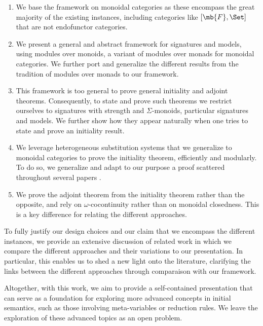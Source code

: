 \begin{enumerate}
  \setlength\itemsep{-1pt}
  \item We base the framework on monoidal categories as these encompass the
        great majority of the existing instances, including categories like
        $[\mb{F},\Set]$ that are not endofunctor categories.

  \item We present a general and abstract framework for signatures and models,
        using modules over monoids, a variant of modules over monads for
        monoidal categories.
        We further port and generalize the different results from the tradition of modules
        over monads to our framework.

  \item This framework is too general to prove general initiality and adjoint theorems.
        Consequently, to state and prove such theorems we restrict ourselves
        to signatures with strength and $Σ$-monoids, particular signatures and models.
        We further show how they appear naturally when one tries to state and prove an initiality result.

  \item We leverage heterogeneous substitution systems that we generalize to monoidal
        categories to prove the initiality theorem, efficiently and modularly.
        To do so, we generalize and adapt to our purpose a proof scattered
        throughout several papers \cite{Hss04,DeBruijnasNestedDatatype99,HssRevisited15,HssUntypedUniMath19}.

  \item We prove the adjoint theorem from the initiality theorem rather than the
        opposite, and rely on $\omega$-cocontinuity rather than on monoidal closedness.
        This is a key difference for relating the different approaches.

\end{enumerate}

To fully justify our design choices and our claim that we encompass the different
instances, we provide an extensive discussion of related work in which we
compare the different approaches and their variations to our presentation.
%
In particular, this enables us to shed a new light onto the literature, clarifying
the links between the different approaches through comparaison with our framework.

Altogether, with this work, we aim to provide a self-contained presentation
that can serve as a foundation for exploring more advanced concepts in initial
semantics, such as those involving meta-variables or reduction rules.
We leave the exploration of these advanced topics as an open problem.



